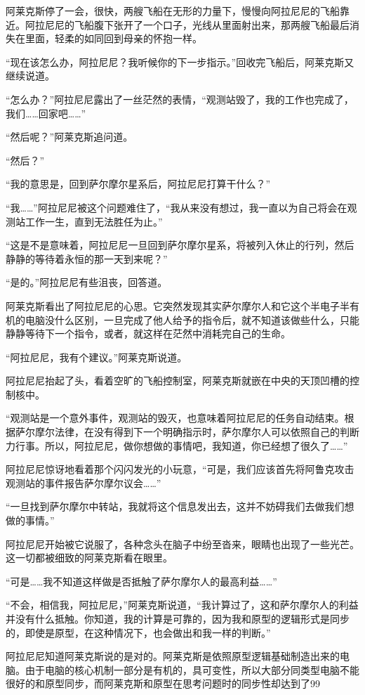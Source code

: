 阿莱克斯停了一会，很快，两艘飞船在无形的力量下，慢慢向阿拉尼尼的飞船靠近。阿拉尼尼的飞船腹下张开了一个口子，光线从里面射出来，那两艘飞船最后消失在里面，轻柔的如同回到母亲的怀抱一样。

“现在该怎么办，阿拉尼尼？我听候你的下一步指示。”回收完飞船后，阿莱克斯又继续说道。

“怎么办？”阿拉尼尼露出了一丝茫然的表情，“观测站毁了，我的工作也完成了，我们……回家吧……”

“然后呢？”阿莱克斯追问道。

“然后？”

“我的意思是，回到萨尔摩尔星系后，阿拉尼尼打算干什么？”

“我……”阿拉尼尼被这个问题难住了，“我从来没有想过，我一直以为自己将会在观测站工作一生，直到无法胜任为止。”

“这是不是意味着，阿拉尼尼一旦回到萨尔摩尔星系，将被列入休止的行列，然后静静的等待着永恒的那一天到来呢？”

“是的。”阿拉尼尼有些沮丧，回答道。

阿莱克斯看出了阿拉尼尼的心思。它突然发现其实萨尔摩尔人和它这个半电子半有机的电脑没什么区别，一旦完成了他人给予的指令后，就不知道该做些什么，只能静静等待下一个指令，或者，就这样在茫然中消耗完自己的生命。

“阿拉尼尼，我有个建议。”阿莱克斯说道。

阿拉尼尼抬起了头，看着空旷的飞船控制室，阿莱克斯就嵌在中央的天顶凹槽的控制核中。

“观测站是一个意外事件，观测站的毁灭，也意味着阿拉尼尼的任务自动结束。根据萨尔摩尔法律，在没有得到下一个明确指示时，萨尔摩尔人可以依照自己的判断力行事。所以，阿拉尼尼，做你想做的事情吧，我知道，你已经想了很久了……”

阿拉尼尼惊讶地看着那个闪闪发光的小玩意，“可是，我们应该首先将阿鲁克攻击观测站的事件报告萨尔摩尔议会……”

“一旦找到萨尔摩尔中转站，我就将这个信息发出去，这并不妨碍我们去做我们想做的事情。”

阿拉尼尼开始被它说服了，各种念头在脑子中纷至沓来，眼睛也出现了一些光芒。这一切都被细致的阿莱克斯看在眼里。

“可是……我不知道这样做是否抵触了萨尔摩尔人的最高利益……”

“不会，相信我，阿拉尼尼，”阿莱克斯说道，“我计算过了，这和萨尔摩尔人的利益并没有什么抵触。你知道，我的计算是可靠的，因为我和原型的逻辑形式是同步的，即使是原型，在这种情况下，也会做出和我一样的判断。”

阿拉尼尼知道阿莱克斯说的是对的。阿莱克斯是依照原型逻辑基础制造出来的电脑。由于电脑的核心机制一部分是有机的，具可变性，所以大部分同类型电脑不能很好的和原型同步，而阿莱克斯和原型在思考问题时的同步性却达到了99%

